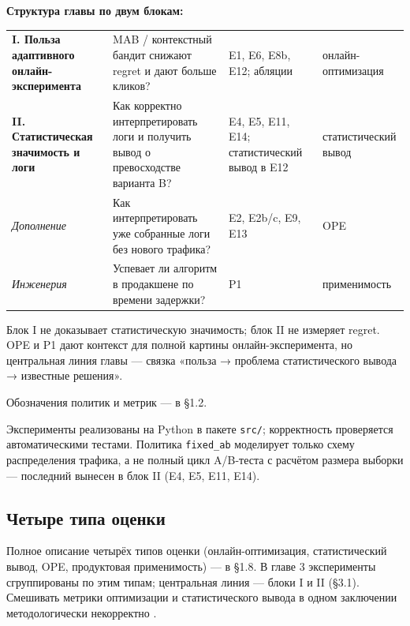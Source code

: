 \textbf{Структура главы по двум блокам:}

\begingroup\footnotesize\setlength{\tabcolsep}{4pt}
\begin{xltabular}{\linewidth}{@{}
  >{\raggedright\arraybackslash}Y
  >{\raggedright\arraybackslash}Y
  >{\raggedright\arraybackslash}Y
  >{\raggedright\arraybackslash}Y@{}}
\toprule\noalign{}
\midrule\noalign{}
\endhead
\bottomrule\noalign{}
\endlastfoot
\textbf{I. Польза адаптивного онлайн-эксперимента} & MAB / контекстный бандит снижают regret и дают больше кликов? & E1, E6, E8b, E12; абляции & онлайн-оптимизация \\
\textbf{II. Статистическая значимость и логи} & Как корректно интерпретировать логи и получить вывод о превосходстве варианта B? & E4, E5, E11, E14; статистический вывод в E12 & статистический вывод \\
\emph{Дополнение} & Как интерпретировать уже собранные логи без нового трафика? & E2, E2b/c, E9, E13 & OPE \\
\emph{Инженерия} & Успевает ли алгоритм в продакшене по времени задержки? & P1 & применимость \\
\end{xltabular}
\endgroup

Блок I не доказывает статистическую значимость; блок II не измеряет regret. OPE и P1 дают контекст для полной картины онлайн-эксперимента, но центральная линия главы --- связка «польза → проблема статистического вывода → известные решения».

Обозначения политик и метрик --- в §1.2.

Эксперименты реализованы на Python в пакете \texttt{src/}; корректность проверяется автоматическими тестами. Политика \texttt{fixed\_ab} моделирует только схему распределения трафика, а не полный цикл A/B-теста с расчётом размера выборки --- последний вынесен в блок II (E4, E5, E11, E14).

\subsection{Четыре типа оценки}\label{ux447ux435ux442ux44bux440ux435-ux442ux438ux43fux430-ux43eux446ux435ux43dux43aux438}

Полное описание четырёх типов оценки (онлайн-оптимизация, статистический вывод, OPE, продуктовая применимость) --- в §1.8. В главе 3 эксперименты сгруппированы по этим типам; центральная линия --- блоки I и II (§3.1). Смешивать метрики оптимизации и статистического вывода в одном заключении методологически некорректно \cite{ref5,ref21}.

